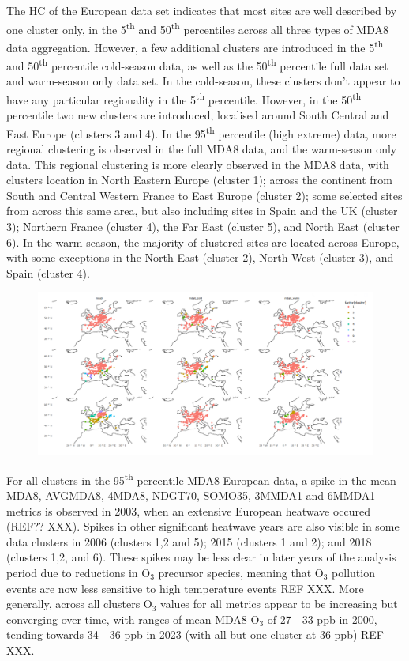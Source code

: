\documentclass[journal abbreviation, manuscript]{copernicus}
\begin{document}
The HC of the European data set indicates that most sites are well described by one cluster only, in the 5\textsuperscript{th} and 50\textsuperscript{th} percentiles across all three types of MDA8 data aggregation. However, a few additional clusters are introduced in the 5\textsuperscript{th} and 50\textsuperscript{th} percentile cold-season data, as well as the 50\textsuperscript{th} percentile full data set and warm-season only data set. In the cold-season, these clusters don't appear to have any particular regionality in the 5\textsuperscript{th} percentile. However, in the 50\textsuperscript{th} percentile two new clusters are introduced, localised around South Central and East Europe (clusters 3 and 4). In the 95\textsuperscript{th} percentile (high extreme) data, more regional clustering is observed in the full MDA8 data, and the warm-season only data. This regional clustering is more clearly observed in the MDA8 data, with clusters location in North Eastern Europe (cluster 1); across the continent from South and Central Western France to East Europe (cluster 2); some selected sites from across this same area, but also including sites in Spain and the UK (cluster 3); Northern France (cluster 4), the Far East (cluster 5), and North East (cluster 6). In the warm season, the majority of clustered sites are located across Europe, with some exceptions in the North East (cluster 2), North West (cluster 3), and Spain (cluster 4).

\begin{figure}[h]
    \centering
    \includegraphics[width=\linewidth]{figures//temporary_clusters/eu_cluster.png}
\end{figure}

For all clusters in the 95\textsuperscript{th} percentile MDA8 European data, a spike in the mean MDA8, AVGMDA8, 4MDA8, NDGT70, SOMO35, 3MMDA1 and 6MMDA1 metrics is observed in 2003, when an extensive European heatwave occured (REF?? XXX). Spikes in other significant heatwave years are also visible in some data clusters in 2006 (clusters 1,2 and 5); 2015 (clusters 1 and 2); and 2018 (clusters 1,2, and 6). These spikes may be less clear in later years of the analysis period due to reductions in O$_3$ precursor species, meaning that O$_3$ pollution events are now less sensitive to high temperature events REF XXX. More generally, across all clusters O$_3$ values for all metrics appear to be increasing but converging over time, with ranges of mean MDA8 O$_3$ of 27 - 33 ppb in 2000, tending towards 34 - 36 ppb in 2023 (with all but one cluster at 36 ppb) REF XXX.
\end{document}
